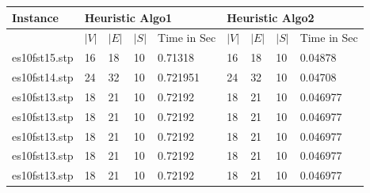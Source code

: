 \begin{table}[ht]
\label{my-label}
\begin{center}
\begin{tabular}{|l|l|l|l|l|l|l|l|l|}
\hline
Instance & \multicolumn{4}{l|}{Heuristic Algo1} & \multicolumn{4}{l|}{Heuristic Algo2} \\ \hline
         & $|V|$      & $|E|$      & $|S|$      & Time in Sec     & $|V|$      & $|E|$      & $|S|$     & Time in Sec    \\ \hline
     es10fst15.stp &  16       &   18       &     10    &  0.71318       &  16        &   18       &      10   &  0.04878 \\ \hline
     es10fst14.stp &  24       &   32       &     10    &  0.721951       &  24        &   32       &      10   &  0.04708 \\ \hline
     es10fst13.stp &  18       &   21       &     10    &  0.72192        &  18        &   21       &      10   &  0.046977 \\ \hline

     es10fst13.stp &  18       &   21       &     10    &  0.72192        &  18        &   21       &      10   &  0.046977 \\ \hline
     es10fst13.stp &  18       &   21       &     10    &  0.72192        &  18        &   21       &      10   &  0.046977 \\ \hline
     es10fst13.stp &  18       &   21       &     10    &  0.72192        &  18        &   21       &      10   &  0.046977 \\ \hline
     es10fst13.stp &  18       &   21       &     10    &  0.72192        &  18        &   21       &      10   &  0.046977 \\ \hline
    


\end{tabular}
\end{center}
\end{table}
